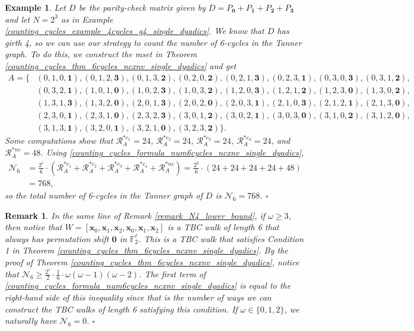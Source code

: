 \documentclass[11pt]{article}
\theoremstyle{plain}
\theoremstyle{plain}
\newtheorem{PreRemark}[lemma]{{\textbf{Remark}}}
\newenvironment{remark}%
    {\begin{PreRemark}\upshape}{\hfill$\square$\end{PreRemark}}
\newtheorem{PreExample}[lemma]{{\textbf{Example}}}
\newenvironment{example}%
    {\begin{PreExample}\upshape}{\hfill$\square$\end{PreExample}}
\theoremstyle{definition}
\numberwithin{theo}{section}
\newcommand{\bzero}{\mathbf{0}}
\newcommand{\bx}{{\mathbf x}}
\begin{document}
\begin{example}
\label{counting_cycles_example_6cycles_g4_single_dyadics}
Let $D$ be the parity-check matrix given by $D=P_{\mathbf{0}}+P_{\mathbf{1}}+P_{\mathbf{2}}+P_{\mathbf{3}}$ and let $N=2^3$ as in Example \ref{counting_cycles_example_4cycles_g4_single_dyadics}. We know that $D$ has girth 4, so we can use our strategy to count the number of 6-cycles in the Tanner graph. To do this, we construct the mset in Theorem \ref{counting_cycles_thm_6cycles_ncxnv_single_dyadics} and get 
\begin{align*}
A=\{&(0,1,0,\mathbf{1}),(0,1,2,\mathbf{3}),(0,1,3,\mathbf{2}),(0,2,0,\mathbf{2}),(0,2,1,\mathbf{3}),(0,2,3,\mathbf{1}),(0,3,0,\mathbf{3}),(0,3,1,\mathbf{2}), \\ &(0,3,2,\mathbf{1}),(1,0,1,\mathbf{0}),(1,0,2,\mathbf{3}),(1,0,3,\mathbf{2}),(1,2,0,\mathbf{3}),(1,2,1,\mathbf{2}),(1,2,3,\mathbf{0}),(1,3,0,\mathbf{2}), \\ &(1,3,1,\mathbf{3}),(1,3,2,\mathbf{0}),(2,0,1,\mathbf{3}),(2,0,2,\mathbf{0}),(2,0,3,\mathbf{1}),(2,1,0,\mathbf{3}),(2,1,2,\mathbf{1}),(2,1,3,\mathbf{0}), \\ &(2,3,0,\mathbf{1}),(2,3,1,\mathbf{0}),(2,3,2,\mathbf{3}),(3,0,1,\mathbf{2}),(3,0,2,\mathbf{1}),(3,0,3,\mathbf{0}),(3,1,0,\mathbf{2}),(3,1,2,\mathbf{0}), \\ &(3,1,3,\mathbf{1}),(3,2,0,\mathbf{1}),(3,2,1,\mathbf{0}),(3,2,3,\mathbf{2})\}.
\end{align*} 
Some computations show that $\mathcal{R}_{A}^{*c_1}=24$, $\mathcal{R}_{A}^{*c_2}=24$, $\mathcal{R}_{A}^{*c_3}=24$, $\mathcal{R}_{A}^{*c_4}=24$, and $\mathcal{R}_{A}^{*nc}=48$. Using \eqref{counting_cycles_formula_num6cycles_ncxnv_single_dyadics},
\begin{align*}
\mathcal{N}_6 &= \frac{2^\ell}{6}\cdot\left(\mathcal{R}_{A}^{*c_1}+\mathcal{R}_{A}^{*c_2}+\mathcal{R}_{A}^{*c_3}+\mathcal{R}_{A}^{*c_4}+\mathcal{R}_{A}^{*nc}\right) = \frac{2^3}{6}\cdot\left(24+24+24+24+48\right) \\
&= 768,
\end{align*}
so the total number of 6-cycles in the Tanner graph of $D$ is $\mathcal{N}_6=768$.
\end{example}

\begin{remark}
\label{remark_N6_lower_bound}
In the same line of Remark \ref{remark_N4_lower_bound}, if $\omega\geq3$, then notice that $W=[\bx_0,\bx_1,\bx_2,\bx_0,\bx_1,\bx_2]$ is a TBC walk of length 6 that always has permutation shift $\bzero$ in $\mathbb{F}_2^\ell$. This is a TBC walk that satisfies Condition 1 in Theorem \ref{counting_cycles_thm_6cycles_ncxnv_single_dyadics}. By the proof of Theorem \ref{counting_cycles_thm_6cycles_ncxnv_single_dyadics}, notice that $\mathcal{N}_6\geq\frac{2^\ell}{2}\cdot\frac{1}{6}\cdot\omega(\omega-1)(\omega-2)$. The first term of \eqref{counting_cycles_formula_num6cycles_ncxnv_single_dyadics} is equal to the right-hand side of this inequality since that is the number of ways we can construct the TBC walks of length 6 satisfying this condition. If $\omega\in\{0,1,2\}$, we naturally have $\mathcal{N}_6=0$. 
\end{remark}
\end{document}
